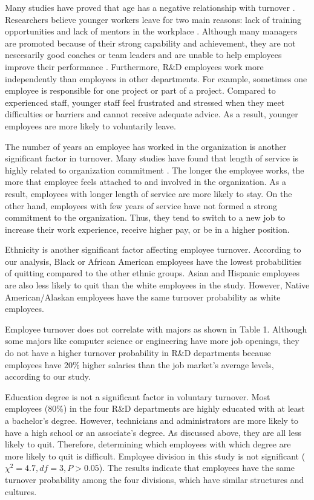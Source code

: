 Many studies have proved that age has a negative relationship with turnover \citep{rhodes1983}. Researchers believe younger workers leave for two main reasons: lack of training opportunities and lack of mentors in the workplace \citep{paul2012}. Although many managers are promoted because of their strong capability and achievement, they are not nescesarily good coaches or team leaders and are unable to help employees improve their performance \citep{smith2009}. Furthermore, R\&D employees work more independently than employees in other departments. For example, sometimes one employee is responsible for one project or part of a project. Compared to experienced staff, younger staff feel frustrated and stressed when they meet difficulties or barriers and cannot receive adequate advice. As a result, younger employees are more likely to voluntarily leave.  

The number of years an employee has worked in the organization is another significant factor in turnover. Many studies have found that length of service is highly related to organization commitment \citep{Jena2015, Kelarijani2014, Popoola2006}. The longer the employee works, the more that employee feels attached to and involved in the organization. As a result, employees with longer length of service are more likely to stay. On the other hand, employees with few years of service have not formed a strong commitment to the organization. Thus, they tend to switch to a new job to increase their work experience, receive higher pay, or be in a higher position.

Ethnicity is another significant factor affecting employee turnover. According to our analysis, Black or African American employees have the lowest probabilities of quitting compared to the other ethnic groups. Asian and Hispanic employees are also less likely to quit than the white employees in the study. However, Native American/Alaskan employees have the same turnover probability as white employees.   

Employee turnover does not correlate with majors as shown in Table 1. Although some majors like computer science or engineering have more job openings, they do not have a higher turnover probability in R\&D departments because employees have 20\% higher salaries than the job market’s average levels, according to our study. 

Education degree is not a significant factor in voluntary turnover. Most employees (80\%) in the four R\&D departments are highly educated with at least a bachelor’s degree. However, technicians and administrators are more likely to have a high school or an associate’s degree. As discussed above, they are all less likely to quit. Therefore, determining which employees with which degree are more likely to quit is difficult.
Employee division in this study is not significant ($\chi^2=4.7, df=3, P > 0.05$). The results indicate that employees have the same turnover probability among the four divisions, which have similar structures and cultures. 
 
